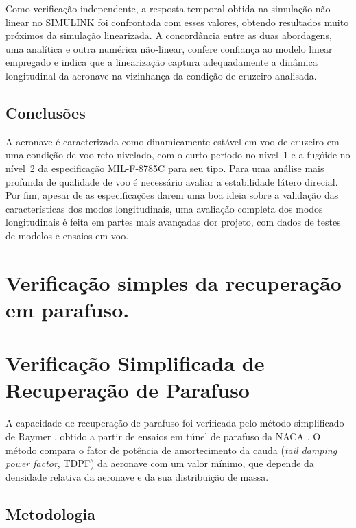 Como verificação independente, a resposta temporal obtida na simulação não-linear no SIMULINK foi confrontada com esses valores, obtendo resultados muito próximos da simulação linearizada. A concordância entre as duas abordagens, uma analítica e outra numérica não-linear, confere confiança ao modelo linear empregado e indica que a linearização captura adequadamente a dinâmica longitudinal da aeronave na vizinhança da condição de cruzeiro analisada.



\subsection{Conclusões}

A aeronave é caracterizada como dinamicamente estável em voo de cruzeiro em uma condição de voo reto nivelado, com o curto período no nível~1 e a fugóide no nível~2 da especificação MIL-F-8785C para seu tipo. Para uma análise mais profunda de qualidade de voo é necessário avaliar a estabilidade látero direcial. Por fim, apesar de as especificações darem uma boa ideia sobre a validação das características dos modos longitudinais, uma avaliação completa dos modos longitudinais é feita em partes mais avançadas dor projeto, com dados de testes de modelos e ensaios em voo.


\section{Verificação simples da recuperação em parafuso.}

\section{Verificação Simplificada de Recuperação de Parafuso}
\label{sec:parafuso}

A capacidade de recuperação de parafuso foi verificada pelo método simplificado de Raymer \cite{raymer2018}, obtido a partir de ensaios em túnel de parafuso da NACA \cite{naca1045}. O método compara o fator de potência de amortecimento da cauda (\textit{tail damping power factor}, TDPF) da aeronave com um valor mínimo, que depende da densidade relativa da aeronave e da sua distribuição de massa.

\subsection{Metodologia}

